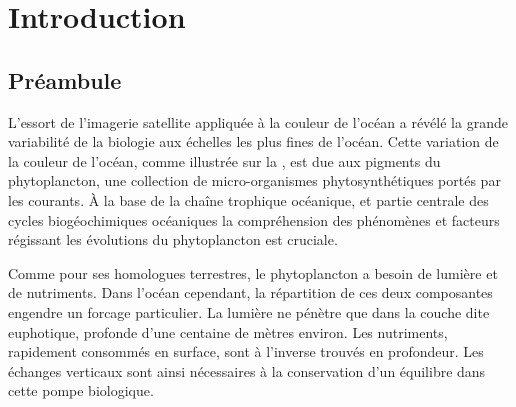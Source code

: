 
\chapter{Introduction}
\addChpLof
\label{chp:introduction}
\graphicspath{{resources/introduction}}

\minitoc%
\clearpage

\begin{figure}[!h]
  \centering
  {%
    \setlength{\fboxsep}{0pt}%
  }%
  \label{fig:oc-illustration}
\end{figure}

\vspace{1\baselineskip}

\section{Préambule}

L'essort de l'imagerie satellite appliquée à la couleur de l'océan  a révélé la grande variabilité de la biologie aux échelles les plus fines de l'océan.
Cette variation de la couleur de l'océan, comme illustrée sur la , est due aux pigments du phytoplancton, une collection de micro-organismes phytosynthétiques portés par les courants.
À la base de la chaîne trophique océanique, et partie centrale des cycles biogéochimiques océaniques  la compréhension des phénomènes et facteurs régissant les évolutions du phytoplancton est cruciale.

Comme pour ses homologues terrestres, le phytoplancton a besoin de lumière et de nutriments.
Dans l'océan cependant, la répartition de ces deux composantes engendre un forcage particulier.
La lumière ne pénètre que dans la couche dite euphotique, profonde d'une centaine de mètres environ.
Les nutriments, rapidement consommés en surface, sont à l'inverse trouvés en profondeur.
Les échanges verticaux  sont ainsi nécessaires à la conservation d'un équilibre dans cette pompe biologique.

